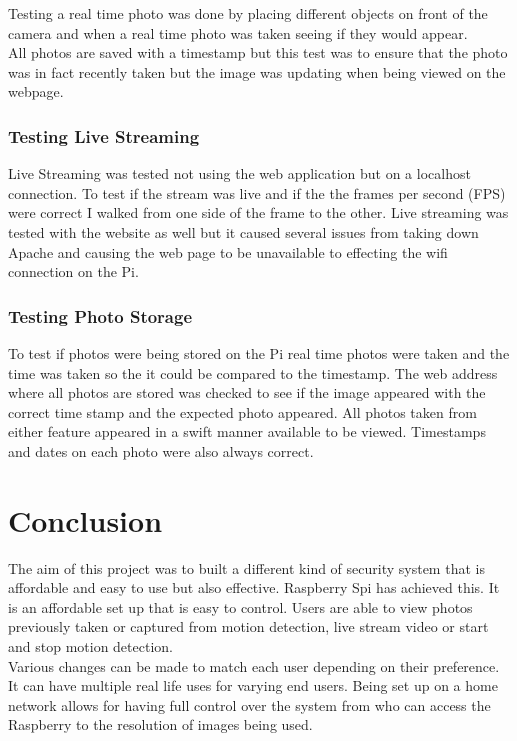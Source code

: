 \documentclass[]{report}
\begin{document}
Testing a real time photo was done by placing different objects on front of the camera and when a real time photo was taken seeing if they would appear. \\

All photos are saved with a timestamp but this test was to ensure that the photo was in fact recently taken but the image was updating when being viewed on the webpage.\\


\subsection{Testing Live Streaming}
\label{subsec:liveStreamTest}
%
Live Streaming was tested not using the web application but on a localhost connection. To test if the stream was live and if the the frames per second (FPS) were correct I walked from one side of the frame to the other. 
Live streaming was tested with the website as well but it caused several issues from taking down Apache and causing the web page to be unavailable to effecting the wifi connection on the Pi.

\subsection{Testing Photo Storage}
\label{subsec:photoStorageTest}
%
To test if photos were being stored on the Pi real time photos were taken and the time was taken  so the it could be compared to the timestamp. The web address where all photos are stored was checked to see if the image appeared with the correct time stamp and the expected photo appeared. All photos taken from either feature appeared in a swift manner available to be viewed. Timestamps and dates on each photo were also always correct.\\


\chapter{Conclusion}
\label{ch:concl}
%
%
%
%
The aim of this project was to built a different kind of security system that is affordable and easy to use but also effective. Raspberry Spi has achieved this. It is an affordable set up that is easy to control. Users are able to view photos previously taken or captured from motion detection, live stream video or start and stop motion detection.\\

Various changes can be made to match each user depending on their preference. It can have multiple real life uses for varying end users. Being set up on a home network allows for having full control over the system from who can access the Raspberry to the resolution of images being used.\\
\end{document}
